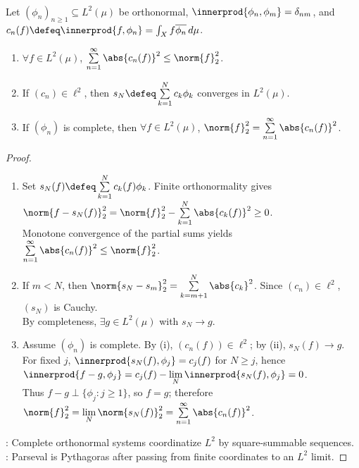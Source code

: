 \begin{theorem} \label{thm:l2-orthonormal-systems-riesz-fischer-parseval} \\
Let $(\phi_n)_{n\geq1}\subseteq L^2(\mu)$ be orthonormal, $\innerprod{\phi_n,\phi_m}=\delta_{nm}$, and $c_n(f)\defeq\innerprod{f,\phi_n}=\int_Xf\overline{\phi_n}\,d\mu$.
\begin{enumerate}[label=(\roman*)]
\setlength{\itemsep}{0pt}
\item $\forall f\in L^2(\mu)$, $\sum\limits_{n=1}^{\infty}\abs{c_n(f)}^2\leq\norm{f}_2^2$.
\item If $(c_n)\in\ell^2$, then $s_N\defeq\sum\limits_{k=1}^{N}c_k\phi_k$ converges in $L^2(\mu)$.
\item If $(\phi_n)$ is complete, then $\forall f\in L^2(\mu)$, $\norm{f}_2^2=\sum\limits_{n=1}^{\infty}\abs{c_n(f)}^2$.
\end{enumerate}
\begin{proof}
\begin{enumerate}[label=(\roman*)]
\setlength{\itemsep}{0pt}
\item Set $s_N(f)\defeq\sum\limits_{k=1}^{N}c_k(f)\phi_k$. Finite orthonormality gives $\norm{f-s_N(f)}_2^2=\norm{f}_2^2-\sum\limits_{k=1}^{N}\abs{c_k(f)}^2\geq0$.\\
Monotone convergence of the partial sums yields $\sum\limits_{n=1}^{\infty}\abs{c_n(f)}^2\leq\norm{f}_2^2$.
\item If $m<N$, then $\norm{s_N-s_m}_2^2=\sum\limits_{k=m+1}^{N}\abs{c_k}^2$. Since $(c_n)\in\ell^2$, $(s_N)$ is Cauchy.\\
By completeness, $\exists g\in L^2(\mu)$ with $s_N\to g$.
\item Assume $(\phi_n)$ is complete. By (i), $(c_n(f))\in\ell^2$; by (ii), $s_N(f)\to g$.\\
For fixed $j$, $\innerprod{s_N(f),\phi_j}=c_j(f)$ for $N\geq j$, hence $\innerprod{f-g,\phi_j}=c_j(f)-\lim\limits_N\innerprod{s_N(f),\phi_j}=0$.\\
Thus $f-g\perp\{\phi_j:j\geq1\}$, so $f=g$; therefore $\norm{f}_2^2=\lim\limits_N\norm{s_N(f)}_2^2=\sum\limits_{n=1}^{\infty}\abs{c_n(f)}^2$.
\end{enumerate}
: Complete orthonormal systems coordinatize $L^2$ by square-summable sequences.\\
: Parseval is Pythagoras after passing from finite coordinates to an $L^2$ limit.
\end{proof}
\end{theorem}

